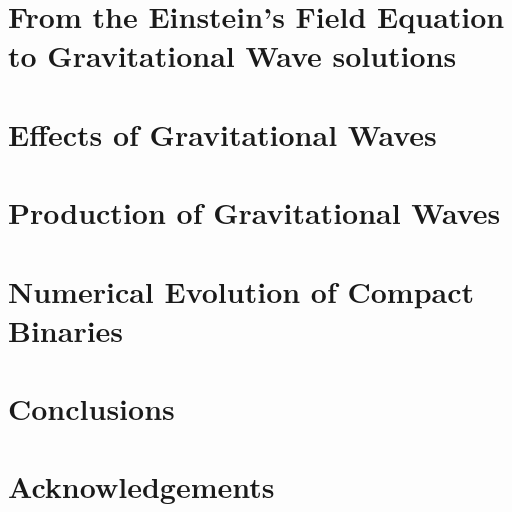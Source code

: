 \documentclass[twoside,english, a4paper, 12pt]{shared/uiofysmaster}
\begin{document}
\clearpage
\section{From the Einstein's Field Equation\\ to Gravitational Wave solutions}
\label{from_equation_to_solution}


\clearpage
\section{Effects of Gravitational Waves}
\label{effects_gw}


\clearpage
\section{Production of Gravitational Waves}
\label{production_gw}


\clearpage
\section{Numerical Evolution of Compact Binaries}
\label{numerical_evolution}


\clearpage
\section{Conclusions}



\clearpage
\section*{Acknowledgements}


%
\clearpage
\printbibliography


\end{document}
